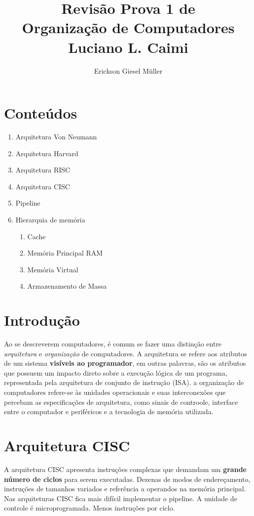 \documentclass{article}
\title{Revisão Prova 1 de\\Organização de Computadores\\Luciano L. Caimi}
\author{Erickson Giesel Müller}
\date{}
\begin{document}
	\maketitle
	\section*{Conteúdos}
		\begin{enumerate}
			\item Arquitetura Von Neumann
			\item Arquitetura Harvard
			\item Arquitetura RISC
			\item Arquitetura CISC
			
			\item Pipeline
			\item Hierarquia de memória
				\begin{enumerate}
				 	\item Cache
				 	\item Memória Principal RAM
				 	\item Memória Virtual
				 	\item Armazenamento de Massa
				\end{enumerate}
		\end{enumerate}
	\section{Introdução}
		Ao se descreverem computadores, é comum se fazer uma distinção entre \textit{arquitetura} e \textit{organização} de computadores. A arquitetura se refere aos atributos de um sistema \textbf{visíveis ao programador}, em outras palavras, são os atributos que possuem um impacto direto sobre a execução lógica de um programa, representada pela arquitetura de conjunto de instrução (ISA). a organização de computadores refere-se às unidades operacionais e suas interconexões que percebam as especificações de arquitetura, como sinais de controole, interface entre o computador e periféricos e a tecnologia de memória utilizada.
	\section{Arquitetura CISC}
		A arquitetura CISC apresenta instruções complexas que demandam um \textbf	{grande número de ciclos} para serem executadas. Dezenas de modos de endereçamento, instruções de tamanhos variados e referência a operandos na memória principal.\\
		Nas arquiteturas CISC fica mais difícil implementar o pipeline. A unidade de controle é microprogramada. Menos instruções por ciclo.
		
\end{document}
